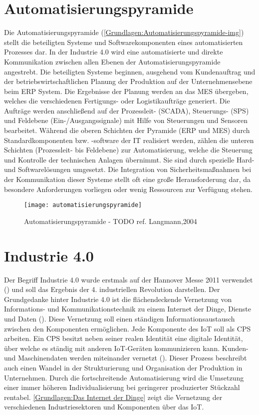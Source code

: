 \clearpage

\section{Automatisierungspyramide}
\label{Grundlagen:Automatisierungspyramide}
Die Automatisierungspyramide (\autoref{Grundlagen:Automatisierungspyramide-img}) stellt die beteiligten Systeme und Softwarekomponenten eines automatisierten Prozesses dar. In der Industrie 4.0 wird eine automatisierte und direkte Kommunikation zwischen allen Ebenen der Automatisierungspyramide angestrebt. Die beteiligten Systeme beginnen, ausgehend vom Kundenauftrag und der betriebswirtschaftlichen Planung der Produktion auf der Unternehmensebene beim \ac{ERP} System. Die Ergebnisse der Planung werden an das \ac{MES} übergeben, welches die verschiedenen Fertigungs- oder Logistikaufträge generiert. Die Aufträge werden anschließend auf der Prozessleit- (\ac{SCADA}), Steuerungs- (\ac{SPS}) und Feldebene (Ein-/Ausgangssignale) mit Hilfe von Steuerungen und Sensoren bearbeitet. Während die oberen Schichten der Pyramide (\ac{ERP} und \ac{MES}) durch Standardkomponenten bzw. -software der IT realisiert werden, zählen die unteren Schichten (Prozessleit- bis Feldebene) zur Automatisierung, welche die Steuerung und Kontrolle der technischen Anlagen übernimmt. Sie sind durch spezielle Hard- und Softwarelösungen umgesetzt. Die Integration von Sicherheitsmaßnahmen bei der Kommunikation dieser Systeme stellt oft eine große Herausforderung dar, da besondere Anforderungen vorliegen oder wenig Ressourcen zur Verfügung stehen.

\begin{figure}[h]
  \centering
  \texttt{[image: automatisierungspyramide]}
  \caption{Automatisierungspyramide - TODO ref. Langmann,2004}
  \label{Grundlagen:Automatisierungspyramide-img}
\end{figure}

\clearpage

\section{Industrie 4.0}
Der Begriff Industrie 4.0 wurde erstmals auf der Hannover Messe 2011 verwendet (\cite{drath2014}) und soll das Ergebnis der 4. industriellen Revolution darstellen. Der Grundgedanke hinter Industrie 4.0 ist die flächendeckende Vernetzung von Informations- und Kommunikationstechnik zu einem Internet der Dinge, Dienste und Daten (\cite{spath2013}). Diese Vernetzung soll einen ständigen Informationsaustausch zwischen den Komponenten ermöglichen. Jede Komponente des \ac{IoT} soll als \ac{CPS} arbeiten. Ein \ac{CPS} besitzt neben seiner realen Identität eine digitale Identität, über welche es ständig mit anderen \ac{IoT}-Geräten kommunizieren kann. Kunden- und Maschinendaten werden miteinander vernetzt (\cite{rami2016}). Dieser Prozess beschreibt auch einen Wandel in der Strukturierung und Organisation der Produktion in Unternehmen. Durch die fortschreitende Automatisierung wird die Umsetzung einer immer höheren Individualisierung bei geringerer produzierter Stückzahl rentabel. \autoref{Grundlagen:Das Internet der Dinge} zeigt die Vernetzung der verschiedenen Industriesektoren und Komponenten über das \ac{IoT}.

